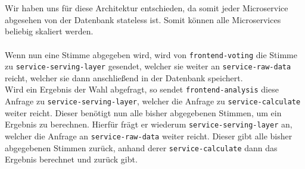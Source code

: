 \\\\
Wir haben uns für diese Architektur entschieden, da somit jeder Microservice abgesehen von der Datenbank stateless ist. Somit können alle Microservices beliebig skaliert werden.\\\\
Wenn nun eine Stimme abgegeben wird, wird von \lstinline{frontend-voting} die Stimme zu 
\lstinline{service-serving-layer} gesendet, welcher sie weiter an \lstinline{service-raw-data} reicht, welcher sie dann anschließend in der Datenbank speichert.\\
Wird ein Ergebnis der Wahl abgefragt, so sendet \lstinline{frontend-analysis} diese Anfrage zu \lstinline{service-serving-layer}, welcher die Anfrage zu \lstinline{service-calculate} weiter reicht. Dieser benötigt nun alle bisher abgegebenen Stimmen, um ein Ergebnis zu berechnen. Hierfür frägt er wiederum \lstinline{service-serving-layer} an, welcher die Anfrage an \lstinline{service-raw-data} weiter reicht. Dieser gibt alle bisher abgegebenen Stimmen zurück, anhand derer \lstinline{service-calculate} dann das Ergebnis berechnet und zurück gibt.

